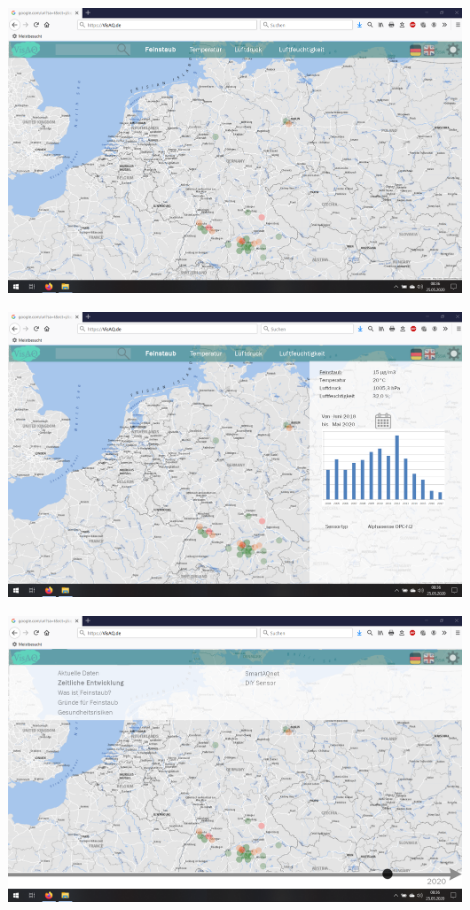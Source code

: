 \begin{center}
	\includegraphics[width=0.9\textwidth]{Screenshots/Startseite} 
	
	\includegraphics[width=0.9\textwidth]{Screenshots/Aktuelle-Daten} 

	\includegraphics[width=0.9\textwidth]{Screenshots/Zeitliche-Entwicklung} 
	

\end{center}
